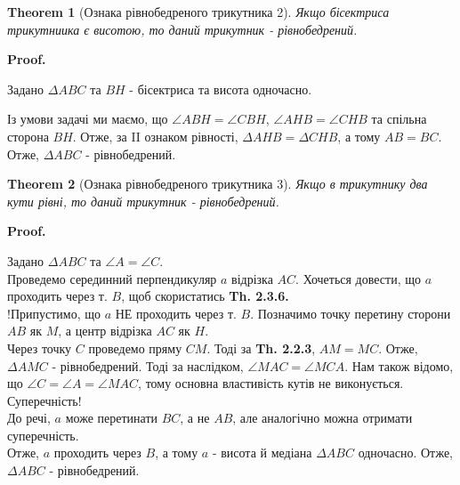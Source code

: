 \documentclass[a4paper, 10pt]{article}
\makeatletter
\def\qed{$\blacksquare$}
\theoremstyle{theoremdd}
\newtheorem{theorem}{Theorem}[subsection]
\theoremstyle{theoremdd}
\theoremstyle{theoremdd}
\theoremstyle{theoremdd}
\theoremstyle{theoremdd}
\theoremstyle{theoremdd}
\theoremstyle{theoremdd}
\theoremstyle{theoremdd}
\theoremstyle{theoremdd}
\renewenvironment{proof}[1][Proof.\\]{\par
\pushQED{\hfill \qed}%
\normalfont \topsep6\p@\@plus6\p@\relax
\trivlist
\item\relax
{\bfseries
#1\@addpunct{.}}\hspace\labelsep\ignorespaces
}{%
\popQED\endtrivlist\@endpefalse
}
\makeatother
\begin{document}
\begin{theorem}[Ознака рівнобедреного трикутника 2]
Якщо бісектриса трикутниика є висотою, то даний трикутник - рівнобедрений.
\end{theorem}

\begin{proof}
Задано $\Delta ABC$ та $BH$ - бісектриса та висота одночасно.
\begin{figure}[H]
\centering
{}
\end{figure}
Із умови задачі ми маємо, що $\angle ABH = \angle CBH$, $\angle AHB = \angle CHB$ та спільна сторона $BH$. Отже, за II ознаком рівності, $\Delta AHB = \Delta CHB$, а тому $AB = BC$. Отже, $\Delta ABC$ - рівнобедрений.
\end{proof}

\begin{theorem}[Ознака рівнобедреного трикутника 3]
Якщо в трикутнику два кути рівні, то даний трикутник - рівнобедрений.
\end{theorem}

\begin{proof}
Задано $\Delta ABC$ та $\angle A = \angle C$.\\
Проведемо серединний перпендикуляр $a$ відрізка $AC$. Хочеться довести, що $a$ проходить через т. $B$, щоб скористатись \textbf{Th. 2.3.6.}\\
!Припустимо, що $a$ НЕ проходить через т. $B$. Позначимо точку перетину сторони $AB$ як $M$, а центр відрізка $AC$ як $H$.\\
Через точку $C$ проведемо пряму $CM$. Тоді за \textbf{Th. 2.2.3}, $AM = MC$. Отже, $\Delta AMC$ - рівнобедрений. Тоді за наслідком, $\angle MAC = \angle MCA$. Нам також відомо, що $\angle C = \angle A = \angle MAC$, тому основна властивість кутів не виконується. Суперечність!\\
До речі, $a$ може перетинати $BC$, а не $AB$, але аналогічно можна отримати суперечність.\\
Отже, $a$ проходить через $B$, а тому $a$ - висота й медіана $\Delta ABC$ одночасно. Отже, $\Delta ABC$ - рівнобедрений.
\end{proof}
\end{document}
